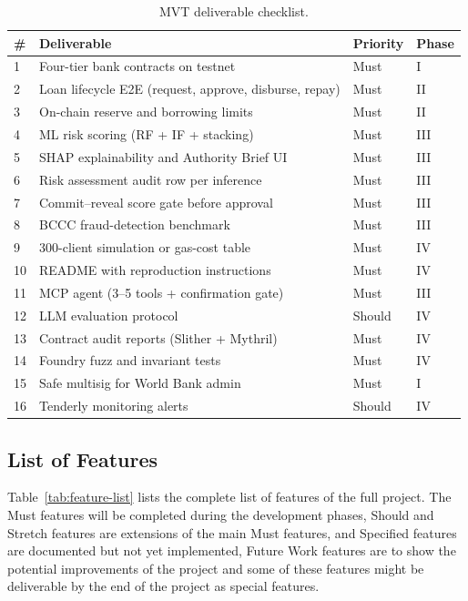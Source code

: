 \documentclass[12pt,a4paper]{report}
\newcommand{\tableheadcolor}{\rowcolor{TableHeadBg}}
\begin{document}
\begin{table}[H]
\centering
\caption[MVT deliverable checklist]{MVT deliverable checklist.}
\label{tab:contributions-vs-future}
\label{tab:mvt-checklist}
\small
\begin{tabular}{p{0.5cm}p{9.2cm}p{1.8cm}p{1.8cm}}
\toprule
\tableheadcolor
\textbf{\#} & \textbf{Deliverable} & \textbf{Priority} & \textbf{Phase} \\
\midrule
1 & Four-tier bank contracts on testnet & Must & I \\
2 & Loan lifecycle E2E (request, approve, disburse, repay) & Must & II \\
3 & On-chain reserve and borrowing limits & Must & II \\
4 & ML risk scoring (RF + IF + stacking) & Must & III \\
5 & SHAP explainability and Authority Brief UI & Must & III \\
6 & Risk assessment audit row per inference & Must & III \\
7 & Commit--reveal score gate before approval & Must & III \\
8 & BCCC fraud-detection benchmark & Must & III \\
9 & 300-client simulation or gas-cost table & Must & IV \\
10 & README with reproduction instructions & Must & IV \\
11 & MCP agent (3--5 tools + confirmation gate) & Must & III \\
12 & LLM evaluation protocol & Should & IV \\
13 & Contract audit reports (Slither + Mythril) & Must & IV \\
14 & Foundry fuzz and invariant tests & Must & IV \\
15 & Safe multisig for World Bank admin & Must & I \\
16 & Tenderly monitoring alerts & Should & IV \\
\bottomrule
\end{tabular}
\end{table}



\subsection{List of Features}
\label{sec:feature-list}

Table~\ref{tab:feature-list} lists the complete list of features of the full project. The Must features will be completed during the development phases, Should and Stretch features are extensions of the main Must features, and Specified features are documented but not yet implemented, Future Work features are to show the potential improvements of the project and some of these features might be deliverable by the end of the project as special features.
\end{document}
